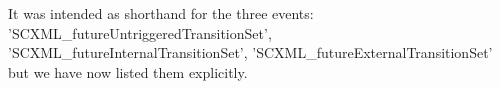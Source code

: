 \documentclass{response}
\begin{document}
\begin{comment}{Reviewer \#3}
  Page 14:

* Mid: "SCXML future..TransitionSet" - is this correct?
\end{comment}

\begin{response}
	It was intended as shorthand for the three events: 'SCXML\_futureUntriggeredTransitionSet', 'SCXML\_futureInternalTransitionSet', 'SCXML\_futureExternalTransitionSet' but we have now listed them explicitly.
\end{response}
\end{document}
